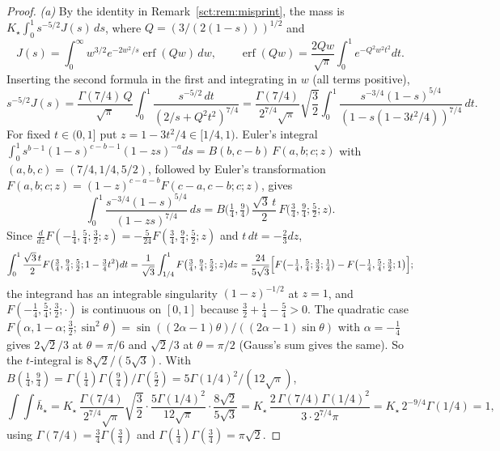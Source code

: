 \documentclass[11pt,letterpaper]{article}
\theoremstyle{definition}\newtheorem{remark}[theorem]{Remark}
\newcommand{\hstar}{\bar h_\star}\newcommand{\fstar}{f_\star}\newcommand{\Kstar}{K_\star}
\newcommand{\erf}{\operatorname{erf}}
\begin{document}
\begin{proof}
\emph{(a)} By the identity in Remark~\ref{sct:rem:misprint}, the mass is $\Kstar\int_0^1s^{-5/2}J(s)\,ds$, where $Q=(3/(2(1-s)))^{1/2}$ and
\[
 J(s)=\int_0^\infty w^{3/2}e^{-2w^2/s}\erf(Qw)\,dw,\qquad
 \erf(Qw)=\frac{2Qw}{\sqrt\pi}\int_0^1e^{-Q^2w^2t^2}dt.
\]
Inserting the second formula in the first and integrating in $w$ (all terms positive),
\[
 s^{-5/2}J(s)=\frac{\Gamma(7/4)\,Q}{\sqrt\pi}\int_0^1\frac{s^{-5/2}\,dt}{(2/s+Q^2t^2)^{7/4}}
 =\frac{\Gamma(7/4)}{2^{7/4}\sqrt\pi}\sqrt{\frac32}\int_0^1
 \frac{s^{-3/4}(1-s)^{5/4}}{(1-s(1-3t^2/4))^{7/4}}\,dt.
\]
For fixed $t\in(0,1]$ put $z=1-3t^2/4\in[1/4,1)$. Euler's integral $\int_0^1s^{b-1}(1-s)^{c-b-1}(1-zs)^{-a}ds=B(b,c-b)\,F(a,b;c;z)$ with $(a,b,c)=(7/4,1/4,5/2)$, followed by Euler's transformation $F(a,b;c;z)=(1-z)^{c-a-b}F(c-a,c-b;c;z)$, gives
\[
 \int_0^1\frac{s^{-3/4}(1-s)^{5/4}}{(1-zs)^{7/4}}\,ds
 =B\bigl(\tfrac14,\tfrac94\bigr)\,\frac{\sqrt3\,t}{2}\,F\bigl(\tfrac34,\tfrac94;\tfrac52;z\bigr).
\]
Since $\frac{d}{dz}F(-\frac14,\frac54;\frac32;z)=-\frac5{24}F(\frac34,\frac94;\frac52;z)$ and $t\,dt=-\frac23dz$,
\[
 \int_0^1\frac{\sqrt3\,t}{2}F\bigl(\tfrac34,\tfrac94;\tfrac52;1-\tfrac34t^2\bigr)dt
 =\frac1{\sqrt3}\int_{1/4}^1F\bigl(\tfrac34,\tfrac94;\tfrac52;z\bigr)dz
 =\frac{24}{5\sqrt3}\Bigl[F\bigl(-\tfrac14,\tfrac54;\tfrac32;\tfrac14\bigr)-F\bigl(-\tfrac14,\tfrac54;\tfrac32;1\bigr)\Bigr];
\]
the integrand has an integrable singularity $(1-z)^{-1/2}$ at $z=1$, and $F(-\frac14,\frac54;\frac32;\cdot)$ is continuous on $[0,1]$ because $\frac32+\frac14-\frac54>0$. The quadratic case $F(\alpha,1-\alpha;\frac32;\sin^2\theta)=\sin((2\alpha-1)\theta)/((2\alpha-1)\sin\theta)$ \cite[\S15.4(i)]{dlmf} with $\alpha=-\frac14$ gives $2\sqrt2/3$ at $\theta=\pi/6$ and $\sqrt2/3$ at $\theta=\pi/2$ (Gauss's sum gives the same). So the $t$-integral is $8\sqrt2/(5\sqrt3)$. With $B(\frac14,\frac94)=\Gamma(\frac14)\Gamma(\frac94)/\Gamma(\frac52)=5\Gamma(1/4)^2/(12\sqrt\pi)$,
\[
 \int\!\!\int\hstar=\Kstar\,\frac{\Gamma(7/4)}{2^{7/4}\sqrt\pi}\sqrt{\frac32}\cdot\frac{5\Gamma(1/4)^2}{12\sqrt\pi}\cdot\frac{8\sqrt2}{5\sqrt3}
 =\Kstar\,\frac{2\,\Gamma(7/4)\Gamma(1/4)^2}{3\cdot2^{7/4}\pi}
 =\Kstar\,2^{-9/4}\Gamma(1/4)=1,
\]
using $\Gamma(7/4)=\frac34\Gamma(\frac34)$ and $\Gamma(\frac14)\Gamma(\frac34)=\pi\sqrt2$.


\end{proof}
\end{document}
